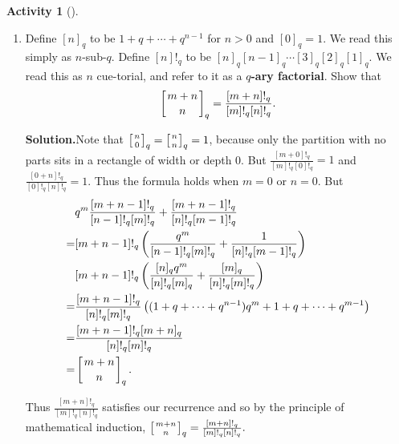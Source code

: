 \documentclass[10pt,]{book}
\newcommand{\terminology}[1]{\textbf{#1}}
\theoremstyle{plain}
\theoremstyle{definition}
\newtheorem{activity}[project]{Activity}
\numberwithin{equation}{chapter}
\newcommand{\qchoose}[2]{\left[{#1\atop#2}\right]_q}
\newcommand{\amp}{&}
\begin{document}
\begin{activity}[]
\begin{enumerate}[label=(\alph*)]
~\par
\item Define \([n]_q\) to be \(1+q+\cdots+q^{n-1}\) for \(n>0\) and \([0]_q =1\).  We read this simply as \(n\)-sub-\(q\). Define \([n]!_q\) to be \([n]_q[n-1]_q\cdots [3]_q[2]_q[1]_q\). We read this as \(n\) cue-torial, and refer to it as a \terminology{\(q\)-ary factorial}. Show that%
\begin{equation*}
\qchoose{m+n}{n} = \frac{[m+n]!_q}{[m]!_q[n]!_q}.
\end{equation*}
%
\par\medskip\noindent%
\textbf{Solution.}\quad Note that \(\qchoose{n}{0}= \qchoose{n}{n} = 1\), because only the partition with no parts sits in a rectangle of width or depth 0. But \(\frac{[m+0]!_q}{[m]!_q[0]!_q} =1\) and \(\frac{[0+n]!_q}{[0]!_q[n]!_q} =1\). Thus the formula holds when \(m=0\) or \(n=0\). But%
\begin{align*}
\amp q^m\frac{[m+n-1]!_q}{[n-1]!_q[m]!_q}+\frac{[m+n-1]!_q}{[n]!_q[m-1]!_q}\\
=\amp \relax[m+n-1]!_q\left(\frac{q^m}{[n-1]!_q[m]!_q}
+\frac{1}{[n]!_q[m-1]!_q}\right)\\
\amp \relax[m+n-1]!_q\left(\frac{[n]_qq^m}{[n]!_q[m]_q}+\frac{[m]_q}{[n]!_q[m]!_q}\right)\\
=\amp \relax\frac{[m+n-1]!_q}{[n]!_q[m]!_q}\left((1+q+\cdots+q^{n-1})q^m +
1+q+\cdots+q^{m-1}\right)\\
=\amp \relax\frac{[m+n-1]!_q[m+n]_q}{[n]!_q[m]!_q}\\
=\amp \qchoose{m+n}{n}.
\end{align*}
%
\par
Thus \(\frac{[m+n]!_q}{[m]!_q[n]!_q}\) satisfies our recurrence and so by the principle of mathematical induction, \(\qchoose{m+n}{n} = \frac{[m+n]!_q}{[m]!_q[n]!_q}.\)%


\end{enumerate}
\end{activity}
\end{document}
